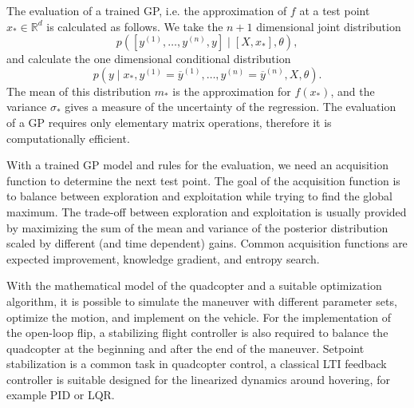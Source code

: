 The evaluation of a trained GP, i.e. the approximation of $f$ at a test point $x_*\in\mathbb{R}^d$ is calculated as follows. We take the $n+1$ dimensional joint distribution $$p([y^{(1)},\dots,y^{(n)},y ] \mid [X,x_*],\theta),$$ and calculate the one dimensional conditional distribution $$p(y\mid x_*,y^{(1)}=\overline y^{(1)}, \dots ,y^{(n)}=\overline y^{(n)},X,\theta ).$$ The mean of this distribution $m_*$ is the approximation for $f(x_*)$, and the variance $\sigma_*$ gives a measure of the uncertainty of the regression. The evaluation of a GP requires only elementary matrix operations, therefore it is computationally efficient.

With a trained GP model and rules for the evaluation, we need an acquisition function to determine the next test point. The goal of the acquisition function is to balance between exploration and exploitation while trying to find the global maximum. The trade-off between exploration and exploitation is usually provided by maximizing the sum of the mean and variance of the posterior distribution scaled by different (and time dependent) gains. Common acquisition functions are expected improvement, knowledge gradient, and entropy search.



With the mathematical model of the quadcopter and a suitable optimization algorithm, it is possible to simulate the maneuver with different parameter sets, optimize the motion, and implement on the vehicle. For the implementation of the open-loop flip, a stabilizing flight controller is also required to balance the quadcopter at the beginning and after the end of the maneuver. Setpoint stabilization is a common task in quadcopter control, a classical LTI feedback controller is suitable designed for the linearized dynamics around hovering, for example PID or LQR. 

